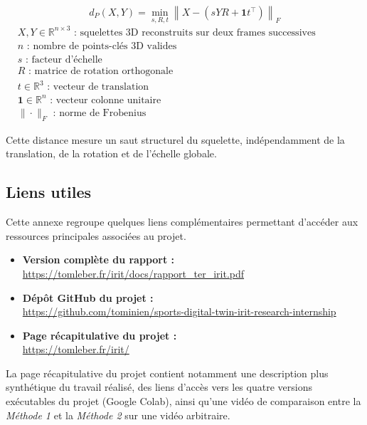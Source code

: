 \documentclass[11pt,a4paper]{article}
\begin{document}
\begin{center}
\[
    d_P(X,Y)
    =
    \min_{s,R,t}
    \left\|
        X - \left(sYR + \mathbf{1}t^\top\right)
    \right\|_F
\]
{\footnotesize
    \(
        \begin{aligned}
            &X,Y \in \mathbb{R}^{n \times 3} \text{ : squelettes 3D reconstruits sur deux frames successives} \\
            &n \text{ : nombre de points-clés 3D valides} \\
            &s \text{ : facteur d'échelle} \\
            &R \text{ : matrice de rotation orthogonale} \\
            &t \in \mathbb{R}^3 \text{ : vecteur de translation} \\
            &\mathbf{1} \in \mathbb{R}^{n} \text{ : vecteur colonne unitaire} \\
            &\|\cdot\|_F \text{ : norme de Frobenius}
        \end{aligned}
    \)
}
\end{center}

Cette distance mesure un saut structurel du squelette, indépendamment de la translation, de la rotation et de l'échelle globale.

\vspace{8em}
\subsection{Liens utiles}

Cette annexe regroupe quelques liens complémentaires permettant d'accéder aux ressources principales associées au projet.

\begin{itemize}
    \item \textbf{Version complète du rapport :}\\
    \url{https://tomleber.fr/irit/docs/rapport_ter_irit.pdf}

    \item \textbf{Dépôt GitHub du projet :}\\
    \url{https://github.com/tominien/sports-digital-twin-irit-research-internship}

    \item \textbf{Page récapitulative du projet :}\\
    \url{https://tomleber.fr/irit/}
\end{itemize}

La page récapitulative du projet contient notamment une description plus synthétique du travail réalisé, des liens d'accès vers les quatre versions exécutables du projet (Google Colab), ainsi qu'une vidéo de comparaison entre la \textit{Méthode 1} et la \textit{Méthode 2} sur une vidéo arbitraire.
\end{document}
